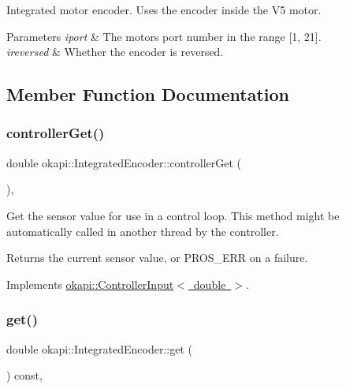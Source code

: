 Integrated motor encoder. Uses the encoder inside the V5 motor.


\begin{DoxyParams}{Parameters}
{\em iport} & The motor\textquotesingle{}s port number in the range \mbox{[}1, 21\mbox{]}. \\
\hline
{\em ireversed} & Whether the encoder is reversed. \\
\hline
\end{DoxyParams}


\subsection{Member Function Documentation}
\mbox{\label{classokapi_1_1IntegratedEncoder_a5898ddc979b9cf2bcee0da3d440f28f8}} 
\subsubsection{\texorpdfstring{controllerGet()}{controllerGet()}}
{\footnotesize\ttfamily double okapi\+::\+Integrated\+Encoder\+::controller\+Get (\begin{DoxyParamCaption}{ }\end{DoxyParamCaption})\hspace{0.3cm}{\ttfamily [override]}, {\ttfamily [virtual]}}

Get the sensor value for use in a control loop. This method might be automatically called in another thread by the controller.

\begin{DoxyReturn}{Returns}
the current sensor value, or {\ttfamily P\+R\+O\+S\+\_\+\+E\+RR} on a failure. 
\end{DoxyReturn}


Implements \mbox{\hyperlink{classokapi_1_1ControllerInput_a3c6c86d897983f367928a93890551e17}{okapi\+::\+Controller\+Input$<$ double $>$}}.

\mbox{\label{classokapi_1_1IntegratedEncoder_af3fe091ddf4b7f36443a5616bfedc3cb}} 
\subsubsection{\texorpdfstring{get()}{get()}}
{\footnotesize\ttfamily double okapi\+::\+Integrated\+Encoder\+::get (\begin{DoxyParamCaption}{ }\end{DoxyParamCaption}) const\hspace{0.3cm}{\ttfamily [override]}, {\ttfamily [virtual]}}

